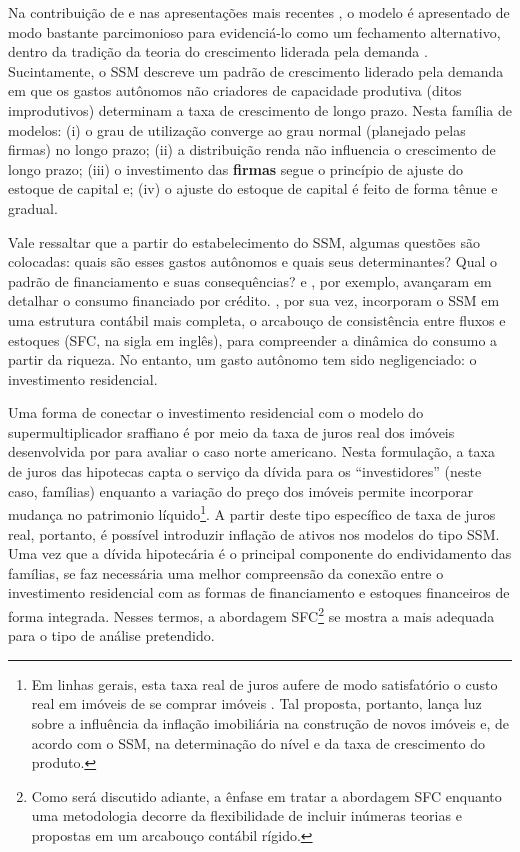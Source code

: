 Na contribuição de \textcite{serrano_sraffian_1995} e nas apresentações mais recentes \cite{freitas_growth_2015}, o modelo é apresentado de modo bastante parcimonioso para evidenciá-lo como um fechamento alternativo, dentro da tradição da teoria do crescimento liderada pela demanda \cite{serrano_sraffian_2017}. 
Sucintamente, o SSM descreve um padrão de crescimento liderado pela demanda em que os gastos autônomos não criadores de capacidade produtiva (ditos improdutivos) determinam a taxa de crescimento de longo prazo. 
Nesta família de modelos: 
(i) o grau de utilização converge ao grau normal (planejado pelas firmas) no longo prazo; 
(ii) a distribuição renda não influencia o crescimento de longo prazo; 
(iii) o investimento das \textbf{firmas} segue o princípio de ajuste do estoque de capital e;
(iv) o ajuste do estoque de capital é feito de forma tênue e gradual. 






Vale ressaltar que a partir do estabelecimento do SSM, algumas questões são colocadas: quais são esses gastos autônomos e quais seus determinantes? Qual o padrão de financiamento e suas consequências? \textcite{pariboni_household_2016} e \textcite{fagundes_dinamica_2017}, por exemplo, avançaram em detalhar o consumo financiado por crédito.  \textcite{brochier_supermultiplier_2018}, por sua vez, incorporam o SSM em uma estrutura contábil mais completa, o arcabouço de consistência entre fluxos e estoques (SFC, na sigla em inglês), para compreender a dinâmica do consumo a partir da riqueza. No entanto, um gasto autônomo tem sido negligenciado: o investimento residencial. 

Uma forma de conectar o investimento residencial com o modelo do supermultiplicador sraffiano é por meio da taxa de juros real dos imóveis desenvolvida por \textcite{teixeira_crescimento_2015} para avaliar o caso norte americano. Nesta formulação, a taxa de juros das hipotecas capta o serviço da dívida para os ``investidores'' (neste caso, famílias) enquanto a variação do preço dos imóveis permite incorporar mudança no patrimonio líquido\footnote{Em linhas gerais, esta taxa real de juros aufere de modo satisfatório o custo real em imóveis de se comprar imóveis \cite[p.~53]{teixeira_crescimento_2015}. Tal proposta, portanto, lança luz sobre a influência da inflação imobiliária na construção de novos imóveis e, de acordo com o SSM, na determinação do nível e da taxa de crescimento do produto.}. 
A partir deste tipo específico de taxa de juros real, portanto, é possível introduzir inflação de ativos nos modelos do tipo SSM. 
Uma vez que a dívida hipotecária é o principal componente do endividamento das famílias, se faz necessária uma melhor compreensão da conexão entre o investimento residencial com as formas de financiamento e estoques financeiros de forma integrada.
Nesses termos, a abordagem SFC\footnote{Como será discutido adiante, a ênfase em tratar a abordagem SFC enquanto uma metodologia decorre da flexibilidade de incluir inúmeras teorias e propostas em um arcabouço contábil rígido. } se mostra a mais adequada para o tipo de análise pretendido. 


